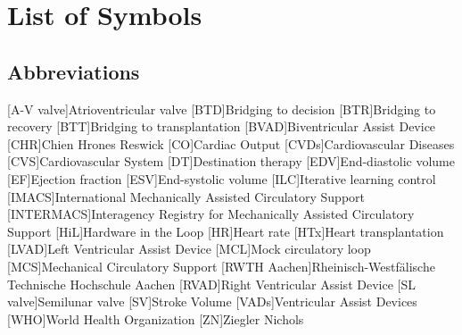 \chapter*{List of Symbols}										%



\section*{Abbreviations}
%
[A-V valve]{Atrioventricular valve}
[BTD]{Bridging to decision}
[BTR]{Bridging to recovery}
[BTT]{Bridging to transplantation}
[BVAD]{Biventricular Assist Device}
[CHR]{Chien Hrones Reswick}
[CO]{Cardiac Output}
[CVDs]{Cardiovascular Diseases}
[CVS]{Cardiovascular System}
[DT]{Destination therapy}
[EDV]{End-diastolic volume}
[EF]{Ejection fraction}
[ESV]{End-systolic volume}
[ILC]{Iterative learning control}
[IMACS]{International Mechanically Assisted Circulatory Support}
[INTERMACS]{Interagency Registry for Mechanically Assisted Circulatory Support}
[HiL]{Hardware in the Loop}
[HR]{Heart rate}
[HTx]{Heart transplantation}
[LVAD]{Left Ventricular Assist Device}
[MCL]{Mock circulatory loop}
[MCS]{Mechanical Circulatory Support}
[RWTH Aachen]{Rheinisch-Westf{\"a}lische Technische Hochschule Aachen}
[RVAD]{Right Ventricular Assist Device}
[SL valve]{Semilunar valve}
[SV]{Stroke Volume}
[VADs]{Ventricular Assist Devices}
[WHO]{World Health Organization}
[ZN]{Ziegler Nichols}


